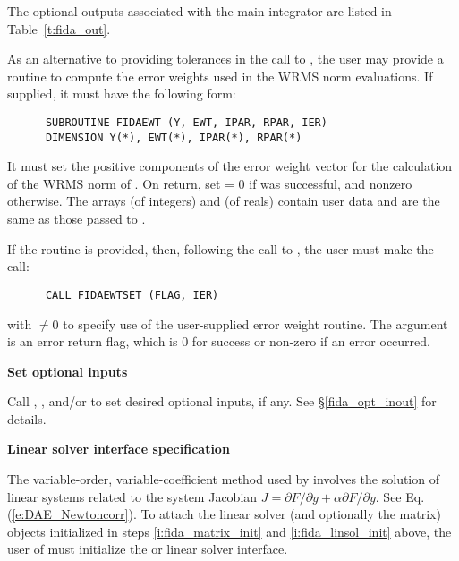 \begin{Steps}
{    The optional outputs associated with the main {\ida} integrator
    are listed in Table~\ref{t:fida_out}.
  }

  As an alternative to providing tolerances in the call to , the
  user may provide a routine to compute the error weights used in the WRMS norm
  evaluations. If supplied, it must have the following form:
\begin{verbatim}
      SUBROUTINE FIDAEWT (Y, EWT, IPAR, RPAR, IER)
      DIMENSION Y(*), EWT(*), IPAR(*), RPAR(*)
\end{verbatim}
  It must set the positive components of the error weight vector  for
  the calculation of the WRMS norm of . On return, set
   = 0 if  was successful, and nonzero otherwise.
  The arrays  (of integers) and  (of reals) contain user data
  and are the same as those passed to .

  If the  routine is provided, then, 
  following the call to , the user must make the call:
\begin{verbatim}
      CALL FIDAEWTSET (FLAG, IER)
\end{verbatim}
  with  $\neq 0$ to specify use of the user-supplied error weight routine.
  The argument  is an error return flag, which is $0$ 
  for success or non-zero if an error occurred.

\item\label{i:fida_opt_input}{\bf Set optional inputs} 

  Call , , and/or  to set desired
  optional inputs, if any.  See \S\ref{fida_opt_inout} for details.

\item\label{i:fida_lin_solv_spec} {\bf Linear solver interface specification} 
  
  The variable-order, variable-coefficient  method used by {\ida} involves
  the solution of linear systems related to the system Jacobian
  $J = \partial F / \partial y + \alpha \partial F / \partial \dot{y}$.
  See Eq. (\ref{e:DAE_Newtoncorr}).    
  To attach the linear solver (and optionally the matrix) objects
  initialized in steps \ref{i:fida_matrix_init} and
  \ref{i:fida_linsol_init} above, the user of {\fida} must initialize
  the {\idadls} or {\idaspils} linear solver interface.


\end{Steps}
